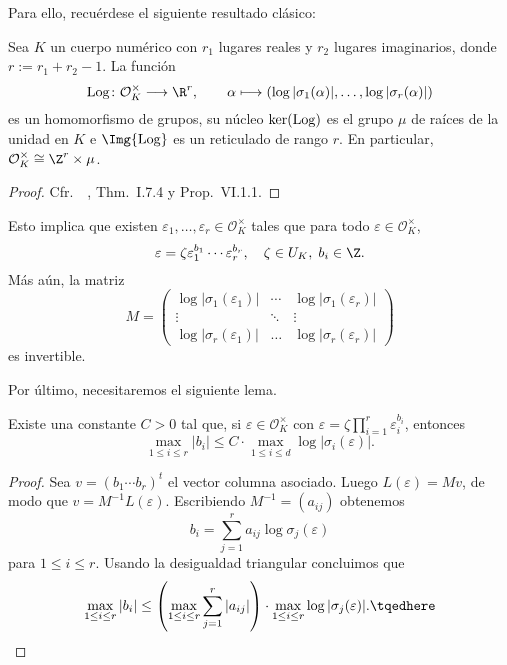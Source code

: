 \documentclass[11pt, reqno]{amsart}
\begin{document}
Para ello, recuérdese el siguiente resultado clásico:
\begin{thm}
	Sea $K$ un cuerpo numérico con $r_1$ lugares reales y $r_2$ lugares imaginarios, donde $r := r_1 + r_2 - 1$.
	La función
	\[
		\operatorname{Log} \colon \mathcal{O}_K^\times \longrightarrow \R^r, \qquad
		\alpha \longmapsto (\log|\sigma_1(\alpha)|, \dots, \log|\sigma_r(\alpha)|)
	\]
	es un homomorfismo de grupos, su núcleo $\ker({\rm Log})$ es el grupo $\mu$ de raíces de la unidad en $K$ 
	e $\Img{\rm Log}$ es un reticulado de rango $r$. En particular, $\mathcal{O}_K^{\times}\cong \Z^r\times\mu$.
\end{thm}
\begin{proof}
	Cfr.\ \citeauthor{neukirch:algebraic}~\cite[42, 358]{neukirch:algebraic}, Thm.~I.7.4 y Prop.\ VI.1.1.
\end{proof}

Esto implica que existen $\varepsilon_1,\ldots,\varepsilon_r\in \mathcal{O}_K^{\times}$ tales que para todo $\varepsilon\in \mathcal{O}_K^{\times}$, $$\varepsilon=\zeta\varepsilon_1^{b_1}\cdots\varepsilon_r^{b_r},\quad \zeta\in U_K,\; b_i\in \Z.$$
Más aún, la matriz
\[
	M = \begin{pmatrix}
		\log|\sigma_1(\varepsilon_1)|  & \cdots & \log|\sigma_1(\varepsilon_r)|\\
		\vdots & \ddots & \vdots \\
		\log|\sigma_r(\varepsilon_1)| & \ldots & \log|\sigma_r(\varepsilon_r)|
	\end{pmatrix} 
\]
es invertible.

Por último, necesitaremos el siguiente lema.

\begin{lem}
	Existe una constante $C>0$ tal que, si $\varepsilon\in\mathcal{O}_K^{\times}$ con $\varepsilon=\zeta\prod_{i=1}^{r}\varepsilon_i^{b_i}$, entonces $$\max_{1\leq i\leq r}|b_i|\leq C\cdot \max_{1\leq i\leq d}\log|\sigma_i(\varepsilon)|.$$
\end{lem}
\begin{proof}
	Sea $v=(b_1\cdots b_r)^t$ el vector columna asociado. Luego $L(\varepsilon)=Mv$, de modo que $v=M^{-1}L(\varepsilon)$.
	Escribiendo $M^{-1}=(a_{ij})$ obtenemos $$b_i=\sum_{j=1}^ra_{ij}\log\sigma_j(\varepsilon)$$ para $1\leq i\leq r$.
	Usando la desigualdad triangular concluimos que
	\begin{equation}
		\max_{1\leq i\leq r}|b_i|\leq \left( \max_{1\leq i\leq r}\sum_{j=1}^r|a_{ij}| \right)\cdot \max_{1\leq i\leq r}\log|\sigma_j(\varepsilon)|.
		\tqedhere
	\end{equation}
\end{proof}
\end{document}

